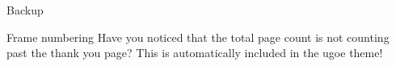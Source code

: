 \documentclass[10pt]{beamer}
\begin{document}
\begin{frame}
  \ugoeAddLogo
  \begin{center}
    \Huge Backup
  \end{center}
\end{frame}

\begin{frame}
  \begin{alertblock}{Frame numbering}
    Have you noticed that the total page count is not counting past the thank 
    you page? This is automatically included in the ugoe theme!
  \end{alertblock}
\end{frame}
\end{document}
